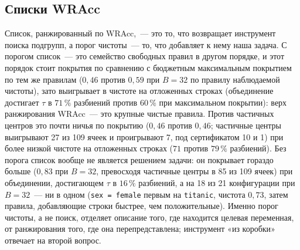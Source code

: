 \documentclass[11pt]{article}
\begin{document}
\subsection{Списки WRAcc}\label{sec:wracc}
Список, ранжированный по WRAcc,~--- это то, что возвращает инструмент поиска подгрупп, а порог чистоты~--- то, что добавляет к нему наша задача. С порогом список~--- это семейство свободных правил в другом порядке, и этот порядок стоит покрытия по сравнению с бюджетным максимальным покрытием по тем же правилам ($0{,}46$ против $0{,}59$ при $B=32$ по правилу наблюдаемой чистоты), зато выигрывает в чистоте на отложенных строках (объединение достигает $\tau$ в $71\,\%$ разбиений против $60\,\%$ при максимальном покрытии): верх ранжирования WRAcc~--- это крупные чистые правила. Против частичных центров это почти ничья по покрытию ($0{,}46$ против $0{,}46$; частичные центры выигрывают 27 из 109 ячеек и проигрывают 7, под сертификатом 10 и 1) при более низкой чистоте на отложенных строках ($71$ против $79\,\%$ разбиений). Без порога список вообще не является решением задачи: он покрывает гораздо больше ($0{,}83$ при $B=32$, превосходя частичные центры в 85 из 109 ячеек) при объединении, достигающем $\tau$ в $16\,\%$ разбиений, а на 18 из 21 конфигурации при $B=32$~--- ни в одном (\texttt{sex = female} первым на \texttt{titanic}, чистота $0{,}73$, затем правила, добавляющие строки быстрее, чем положительные). Именно порог чистоты, а не поиск, отделяет описание того, где находится целевая переменная, от ранжирования того, где она перепредставлена; инструмент «из коробки» отвечает на второй вопрос.
\end{document}
